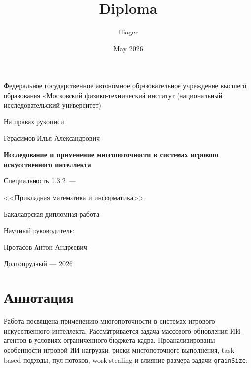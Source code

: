 \documentclass[14pt,a4paper,oneside]{extreport}
\title{Diploma}
\author{Iliager}
\date{May 2026}
\providecommand{\supervisorRegalia}{}
\begin{document}
\thispagestyle{empty}%
\begin{center}%
Федеральное государственное автономное образовательное учреждение
высшего образования «Московский физико-технический институт
(национальный исследовательский университет)
\end{center}%

\vspace{0pt plus4fill}
\begin{flushright}%
На правах рукописи
\end{flushright}%

\vspace{0pt plus6fill}
\begin{center}%
{\large Герасимов Илья Александрович}
\end{center}%

\vspace{0pt plus1fill}
\begin{center}%
\textbf {\large Исследование и применение многопоточности в системах игрового искусственного интеллекта}

\vspace{0pt plus2fill}
{%
Специальность 1.3.2~---

<<Прикладная математика и информатика>>
}

\vspace{0pt plus2fill}
Бакалаврская дипломная работа

\end{center}%

\vspace{0pt plus4fill}
\begin{flushright}%
Научный руководитель:

\supervisorRegalia

Протасов Антон Андреевич
\end{flushright}%

\vspace{0pt plus4fill}
\begin{center}%
{Долгопрудный --- 2026}
\end{center}%
\newpage

\section*{Аннотация}

Работа посвящена применению многопоточности в системах игрового искусственного интеллекта. Рассматривается задача массового обновления ИИ-агентов в условиях ограниченного бюджета кадра. Проанализированы особенности игровой ИИ-нагрузки, риски многопоточного выполнения, task-based подходы, пул потоков, work stealing и влияние размера задачи \texttt{grainSize}.
\end{document}
